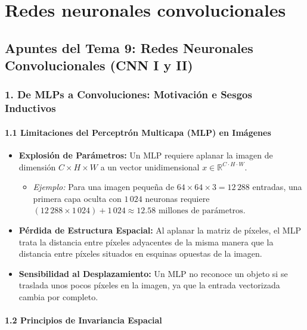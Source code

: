 \chapter{Redes neuronales convolucionales}
\section{Apuntes del Tema 9: Redes Neuronales Convolucionales (CNN I y II)}

\subsection{1. De MLPs a Convoluciones: Motivación e Sesgos Inductivos}

\subsubsection{1.1 Limitaciones del Perceptrón Multicapa (MLP) en Imágenes}

\begin{itemize}
	\item \textbf{Explosión de Parámetros:} Un MLP requiere aplanar la imagen de dimensión $C \times H \times W$ a un vector unidimensional $x \in \mathbb{R}^{C \cdot H \cdot W}$.
	\begin{itemize}
		\item \emph{Ejemplo:} Para una imagen pequeña de $64 \times 64 \times 3 = 12\,288$ entradas, una primera capa oculta con $1\,024$ neuronas requiere $(12\,288 \times 1\,024) + 1\,024 \approx 12.58 \text{ millones de parámetros}$.
	\end{itemize}
	
	\item \textbf{Pérdida de Estructura Espacial:} Al aplanar la matriz de píxeles, el MLP trata la distancia entre píxeles adyacentes de la misma manera que la distancia entre píxeles situados en esquinas opuestas de la imagen.
	
	\item \textbf{Sensibilidad al Desplazamiento:} Un MLP no reconoce un objeto si se traslada unos pocos píxeles en la imagen, ya que la entrada vectorizada cambia por completo.
\end{itemize}

\subsubsection{1.2 Principios de Invariancia Espacial}

